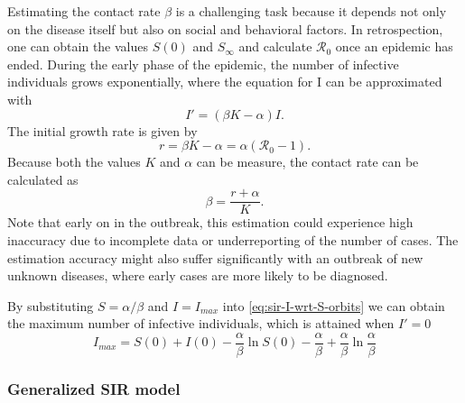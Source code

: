 Estimating the contact rate $\beta$ is a challenging task because it depends not only on the disease itself but also on social and behavioral factors.
In retrospection, one can obtain the values $S(0)$ and $S_\infty$ and calculate $\mathcal{R}_0$ once an epidemic has ended.
During the early phase of the epidemic, the number of infective individuals grows exponentially, where the equation for I can be approximated with
\begin{equation}
    I' = (\beta K - \alpha) I.
\end{equation}
The initial growth rate is given by
\begin{equation}
    r = \beta K - \alpha = \alpha (\mathcal{R}_0 - 1).
\end{equation}
Because both the values $K$ and $\alpha$ can be measure, the contact rate can be calculated as
\begin{equation}
    \beta = \frac{r + \alpha}{K}.
\end{equation}
Note that early on in the outbreak, this estimation could experience high inaccuracy due to incomplete data or underreporting of the number of cases.
The estimation accuracy might also suffer significantly with an outbreak of new unknown diseases, where early cases are more likely to be diagnosed.

By substituting $S = \alpha / \beta$ and $I = I_{max}$ into \autoref{eq:sir-I-wrt-S-orbits} we can obtain the maximum number of infective individuals, which is attained when $I' = 0$
\begin{equation}
    I_{max} = S(0) + I(0) - \frac{\alpha}{\beta} \ln S(0) - \frac{\alpha}{\beta} + \frac{\alpha}{\beta} \ln \frac{\alpha}{\beta}
\end{equation}

\subsubsection{Generalized SIR model}

